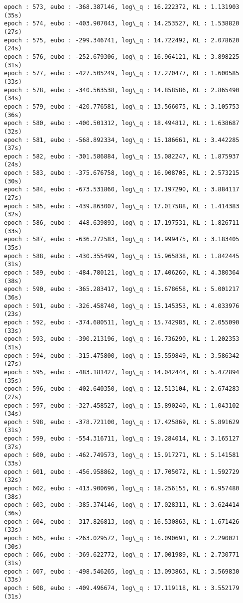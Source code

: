 \documentclass[11pt]{article}
\begin{document}
\begin{Verbatim}[commandchars=\\\{\}]
epoch : 573, eubo : -368.387146, log\_q : 16.222372, KL : 1.131903 (35s)
epoch : 574, eubo : -403.907043, log\_q : 14.253527, KL : 1.538820 (27s)
epoch : 575, eubo : -299.346741, log\_q : 14.722492, KL : 2.078620 (24s)
epoch : 576, eubo : -252.679306, log\_q : 16.964121, KL : 3.898225 (31s)
epoch : 577, eubo : -427.505249, log\_q : 17.270477, KL : 1.600585 (33s)
epoch : 578, eubo : -340.563538, log\_q : 14.858586, KL : 2.865490 (34s)
epoch : 579, eubo : -420.776581, log\_q : 13.566075, KL : 3.105753 (36s)
epoch : 580, eubo : -400.501312, log\_q : 18.494812, KL : 1.638687 (32s)
epoch : 581, eubo : -568.892334, log\_q : 15.186661, KL : 3.442285 (37s)
epoch : 582, eubo : -301.586884, log\_q : 15.082247, KL : 1.875937 (24s)
epoch : 583, eubo : -375.676758, log\_q : 16.908705, KL : 2.573215 (30s)
epoch : 584, eubo : -673.531860, log\_q : 17.197290, KL : 3.884117 (27s)
epoch : 585, eubo : -439.863007, log\_q : 17.017588, KL : 1.414383 (32s)
epoch : 586, eubo : -448.639893, log\_q : 17.197531, KL : 1.826711 (33s)
epoch : 587, eubo : -636.272583, log\_q : 14.999475, KL : 3.183405 (35s)
epoch : 588, eubo : -430.355499, log\_q : 15.965838, KL : 1.842445 (31s)
epoch : 589, eubo : -484.780121, log\_q : 17.406260, KL : 4.380364 (38s)
epoch : 590, eubo : -365.283417, log\_q : 15.678658, KL : 5.001217 (36s)
epoch : 591, eubo : -326.458740, log\_q : 15.145353, KL : 4.033976 (23s)
epoch : 592, eubo : -374.680511, log\_q : 15.742985, KL : 2.055090 (33s)
epoch : 593, eubo : -390.213196, log\_q : 16.736290, KL : 1.202353 (31s)
epoch : 594, eubo : -315.475800, log\_q : 15.559849, KL : 3.586342 (27s)
epoch : 595, eubo : -483.181427, log\_q : 14.042444, KL : 5.472894 (35s)
epoch : 596, eubo : -402.640350, log\_q : 12.513104, KL : 2.674283 (27s)
epoch : 597, eubo : -327.458527, log\_q : 15.890240, KL : 1.043102 (34s)
epoch : 598, eubo : -378.721100, log\_q : 17.425869, KL : 5.891629 (31s)
epoch : 599, eubo : -554.316711, log\_q : 19.284014, KL : 3.165127 (37s)
epoch : 600, eubo : -462.749573, log\_q : 15.917271, KL : 5.141581 (33s)
epoch : 601, eubo : -456.958862, log\_q : 17.705072, KL : 1.592729 (32s)
epoch : 602, eubo : -413.900696, log\_q : 18.256155, KL : 6.957480 (38s)
epoch : 603, eubo : -385.374146, log\_q : 17.028311, KL : 3.624414 (36s)
epoch : 604, eubo : -317.826813, log\_q : 16.530863, KL : 1.671426 (33s)
epoch : 605, eubo : -263.029572, log\_q : 16.090691, KL : 2.290021 (30s)
epoch : 606, eubo : -369.622772, log\_q : 17.001989, KL : 2.730771 (31s)
epoch : 607, eubo : -498.546265, log\_q : 13.093863, KL : 3.569830 (33s)
epoch : 608, eubo : -409.496674, log\_q : 17.119118, KL : 3.552179 (31s)

\end{Verbatim}
\end{document}
